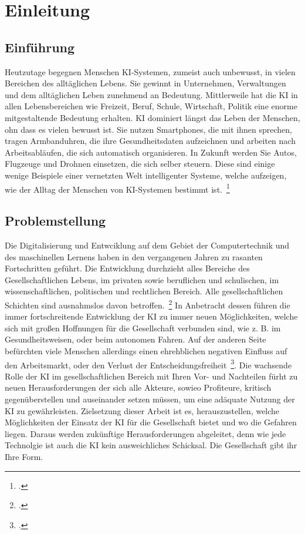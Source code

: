 \section{Einleitung}
\subsection{Einführung}
Heutzutage begegnen Menschen \ac{KI}-Systemen, zumeist auch unbewusst, in vielen Bereichen des alltäglichen Lebens. Sie gewinnt in Unternehmen, Verwaltungen und dem alltäglichen
Leben zunehmend an Bedeutung. 
Mittlerweile hat die \ac{KI} in allen Lebensbereichen wie Freizeit, Beruf, Schule, Wirtschaft, Politik eine enorme mitgestaltende Bedeutung erhalten. \ac{KI} dominiert 
längst das Leben der Menschen, ohn dass es vielen bewusst ist. Sie nutzen Smartphones, die mit ihnen sprechen, tragen Armbanduhren, die ihre Gesundheitsdaten aufzeichnen und arbeiten nach Arbeitsabläufen, die 
sich automatisch organisieren. In Zukunft werden Sie Autos, Flugzeuge und Drohnen einsetzen, die sich selber steuern. Diese sind einige wenige Beispiele einer vernetzten Welt intelligenter 
Systeme, welche aufzeigen, wie der Alltag der Menschen von \ac{KI}-Systemen bestimmt ist.~\footcite[\vglf][]{Mainzer.2019}
\subsection{Problemstellung}
Die Digitalisierung und Entwciklung auf dem Gebiet der Computertechnik und des maschinellen Lernens haben in den vergangenen Jahren zu rasanten Fortschritten geführt. Die Entwicklung
durchzieht alles Bereiche des Gesellschaftlichen Lebens, im privaten sowie beruflichen und schulischen, im wissenschaftlichen, politischen und rechtlichen Bereich. Alle gesellschaftlichen
Schichten sind ausnahmslos davon betroffen.~\footcite[\vglf][]{Lenzen.2020}
In Anbetracht dessen führen die immer fortschreitende Entwicklung der KI zu immer neuen Möglichkeiten, welche sich mit großen Hoffnungen für die Gesellschaft verbunden sind, wie z. B. im Gesundheitsweisen, 
oder beim autonomen Fahren. 
Auf der anderen Seite befürchten viele Menschen allerdings einen ehrehblichen negativen Einfluss auf den Arbeitsmarkt, oder den Verlust der Entscheidungsfreiheit~\footcite[\vglf][]{Wittpahl.2018}.
Die wachsende Rolle der \ac{KI} im gesellschaftlichen Bereich mit Ihren Vor- und Nachteilen fürht zu neuen Herausforderungen der sich alle Akteure, sowieo Profiteure, kritisch 
gegenüberstellen und auseinander setzen müssen, um eine adäquate Nutzung der \ac{KI} zu gewährleisten. Zielsetzung dieser Arbeit ist es, herauszustellen, welche Möglichkeiten
der Einsatz der \ac{KI} für die Gesellschaft bietet und wo die Gefahren liegen. Daraus werden zukünftige Herausforderungen abgeleitet, denn wie jede Technolgie ist auch die \ac{KI}
kein ausweichliches Schicksal. Die Gesellschaft gibt ihr Ihre Form. 

